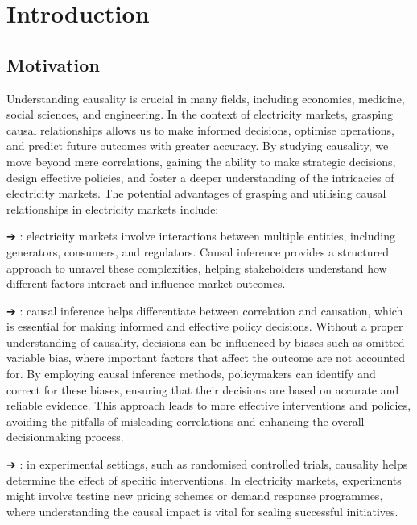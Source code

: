 \documentclass[letterpaper,10pt,english]{jupyterBook}
\begin{document}
\part{Introduction}

\sphinxstepscope


\chapter{Motivation}
\label{\detokenize{notebooks/motivation:motivation}}\label{\detokenize{notebooks/motivation::doc}}
\sphinxAtStartPar
Understanding causality is crucial in many fields, including economics, medicine, social sciences, and engineering. In the context of electricity markets, grasping causal relationships allows us to make informed decisions, optimise operations, and predict future outcomes with greater accuracy. By studying causality, we move beyond mere correlations, gaining the ability to make strategic decisions, design effective policies, and foster a deeper understanding of the intricacies of electricity markets. The potential advantages of grasping and utilising causal relationships in electricity markets include:

\sphinxAtStartPar
➔ : electricity markets involve interactions between multiple entities, including generators, consumers, and regulators. Causal inference provides a structured approach to unravel these complexities, helping stakeholders understand how different factors interact and influence market outcomes.

\sphinxAtStartPar
➔ : causal inference helps differentiate between correlation and causation, which is essential for making informed and effective policy decisions. Without a proper understanding of causality, decisions can be influenced by biases such as omitted variable bias, where important factors that affect the outcome are not accounted for. By employing causal inference methods, policymakers can identify and correct for these biases, ensuring that their decisions are based on accurate and reliable evidence. This approach leads to more effective interventions and policies, avoiding the pitfalls of misleading correlations and enhancing the overall decision\sphinxhyphen{}making process.

\sphinxAtStartPar
➔ : in experimental settings, such as randomised controlled trials, causality helps determine the effect of specific interventions. In electricity markets, experiments might involve testing new pricing schemes or demand response programmes, where understanding the causal impact is vital for scaling successful initiatives.
\end{document}
